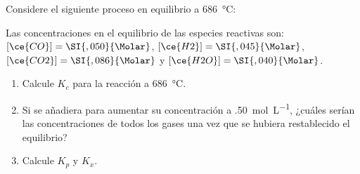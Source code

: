 Considere el siguiente proceso en equilibrio a \SI{686}{\celsius}:
\begin{center}
\end{center}
Las concentraciones en el equilibrio de las especies reactivas son: $[\ce{CO}] = \SI{,050}{\Molar}$, $[\ce{H2}] = \SI{,045}{\Molar}$, $[\ce{CO2}] = \SI{,086}{\Molar}$ y $[\ce{H2O}] = \SI{,040}{\Molar}$. 
\begin{enumerate}[label={\alph*)},font=\bfseries]
	\item Calcule $K_c$ para la reacción a \SI{686}{\celsius}.
	\item Si se añadiera  para aumentar su concentración a \SI{,50}{\mol\per\liter}, ¿cuáles serían las concentraciones de todos los gases una vez que se hubiera restablecido el equilibrio? 
	\item Calcule $K_p$ y $K_x$. 
\end{enumerate}
